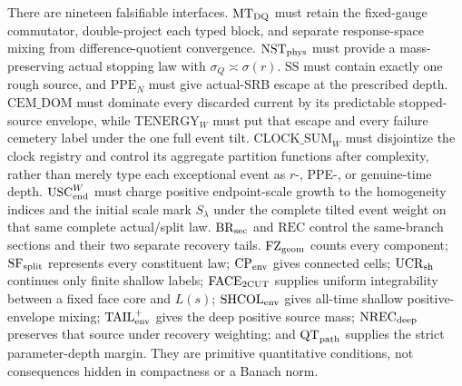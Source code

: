 \documentclass[11pt]{article}
\begin{document}
There are nineteen falsifiable interfaces.  $\mathrm{MT}_{\rm DQ}$ must
retain the fixed-gauge commutator, double-project each typed block, and
separate response-space mixing from difference-quotient convergence.
$\mathrm{NST}_{\rm phys}$ must provide a
mass-preserving actual stopping law with
$\sigma_Q\asymp\sigma(r)$.  $\mathrm{SS}$ must contain exactly one rough source, and
$\mathrm{PPE}_{N}$ must give actual-SRB escape at the prescribed depth.
$\mathrm{CEM\_DOM}$ must dominate every discarded current by its predictable
stopped-source envelope, while $\mathrm{TENERGY}_{W}$ must put that escape
and every failure cemetery label under the one full event tilt.
$\mathrm{CLOCK\_SUM}_{W}$ must disjointize the clock registry and control its
aggregate partition functions after complexity, rather than merely type each
exceptional event as $r$-, PPE-, or genuine-time depth.
$\mathrm{USC}_{\rm end}^{W}$ must charge positive endpoint-scale growth to the
homogeneity indices and the initial scale mark $S_\lambda$ under the complete
tilted event weight on that same complete actual/split law.
$\mathrm{BR}_{\rm sec}$ and $\mathrm{REC}$ control the same-branch
sections and their two separate recovery tails.
$\mathrm{FZ}_{\rm geom}$ counts every component;
$\mathrm{SF}_{\rm split}$ represents every constituent law;
$\mathrm{CP}_{\rm env}$ gives connected cells;
$\mathrm{UCR}_{\rm sh}$ continues only finite shallow labels;
$\mathrm{FACE}_{\rm 2CUT}$ supplies uniform integrability between a fixed
face core and $L(s)$;
$\mathrm{SHCOL}_{\rm env}$ gives all-time shallow positive-envelope
mixing; $\mathrm{TAIL}_{\rm env}^{+}$ gives the deep positive source mass;
$\mathrm{NREC}_{\rm deep}$ preserves that source under recovery weighting;
and $\mathrm{QT}_{\rm path}$ supplies the strict parameter-depth margin.
They are primitive quantitative conditions, not consequences hidden in
compactness or a Banach norm.
\end{document}
